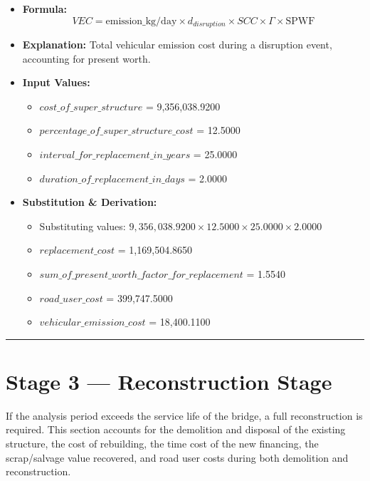 \documentclass[12pt,a4paper]{article}
\begin{document}
\begin{itemize}
  \item \textbf{Formula:} $$VEC = \text{emission\_kg/day} \times d_{disruption} \times SCC \times \Gamma \times \text{SPWF}$$
  \item \textbf{Explanation:} Total vehicular emission cost during a disruption event, accounting for present worth.
  \item \textbf{Input Values:}
  \begin{itemize}
    \item $cost\_of\_super\_structure$ = 9,356,038.9200
    \item $percentage\_of\_super\_structure\_cost$ = 12.5000
    \item $interval\_for\_replacement\_in\_years$ = 25.0000
    \item $duration\_of\_replacement\_in\_days$ = 2.0000
  \end{itemize}
  \item \textbf{Substitution \& Derivation:}
  \begin{itemize}
    \item Substituting values: $9,356,038.9200 \times 12.5000 \times 25.0000 \times 2.0000$
    \item $replacement\_cost$ = 1,169,504.8650
    \item $sum\_of\_present\_worth\_factor\_for\_replacement$ = 1.5540
    \item $road\_user\_cost$ = 399,747.5000
    \item $vehicular\_emission\_cost$ = 18,400.1100
  \end{itemize}
\end{itemize}


\medskip\hrule\medskip



\section{Stage 3 --- Reconstruction Stage}

If the analysis period exceeds the service life of the bridge, a full reconstruction is required. This section accounts for the demolition and disposal of the existing structure, the cost of rebuilding, the time cost of the new financing, the scrap/salvage value recovered, and road user costs during both demolition and reconstruction.
\end{document}
